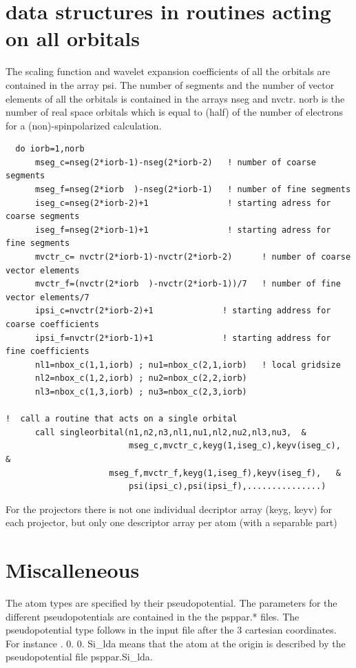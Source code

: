 \documentclass[12pt]{article}
\begin{document}
\section{data structures in routines acting on all orbitals}
The scaling function and wavelet expansion coefficients of all the orbitals are 
contained in the array {\color{red} psi}. The number of segments and the number of 
vector elements of all the orbitals is contained in the arrays {\color{red} nseg} and 
{\color{red} nvctr}. 
{\color{red} norb} is the number of real space orbitals which is equal to (half) 
of the number of electrons for a (non)-spinpolarized calculation.

\begin{verbatim}
  do iorb=1,norb
      mseg_c=nseg(2*iorb-1)-nseg(2*iorb-2)   ! number of coarse segments
      mseg_f=nseg(2*iorb  )-nseg(2*iorb-1)   ! number of fine segments
      iseg_c=nseg(2*iorb-2)+1                ! starting adress for coarse segments
      iseg_f=nseg(2*iorb-1)+1                ! starting adress for fine segments
      mvctr_c= nvctr(2*iorb-1)-nvctr(2*iorb-2)      ! number of coarse vector elements
      mvctr_f=(nvctr(2*iorb  )-nvctr(2*iorb-1))/7   ! number of fine vector elements/7
      ipsi_c=nvctr(2*iorb-2)+1              ! starting address for coarse coefficients 
      ipsi_f=nvctr(2*iorb-1)+1              ! starting address for fine coefficients
      nl1=nbox_c(1,1,iorb) ; nu1=nbox_c(2,1,iorb)   ! local gridsize
      nl2=nbox_c(1,2,iorb) ; nu2=nbox_c(2,2,iorb)
      nl3=nbox_c(1,3,iorb) ; nu3=nbox_c(2,3,iorb)

!  call a routine that acts on a single orbital
      call singleorbital(n1,n2,n3,nl1,nu1,nl2,nu2,nl3,nu3,  &
                         mseg_c,mvctr_c,keyg(1,iseg_c),keyv(iseg_c),   &
            		 mseg_f,mvctr_f,keyg(1,iseg_f),keyv(iseg_f),   &
                         psi(ipsi_c),psi(ipsi_f),...............)

\end{verbatim}

For the projectors there is not one individual decriptor array (keyg, keyv) for 
each projector, but only one descriptor array per atom (with a separable part)


\section{Miscalleneous}
The atom types are specified by their pseudopotential. 
The parameters for the different pseudopotentials are contained in the 
the psppar.* files.
The pseudopotential type follows in the input file after the 3 cartesian coordinates. 
For instance .  0. 0.  Si\_lda  \newline 
means that the atom at the origin is described by the pseudopotential 
file psppar.Si\_lda.
\end{document}
